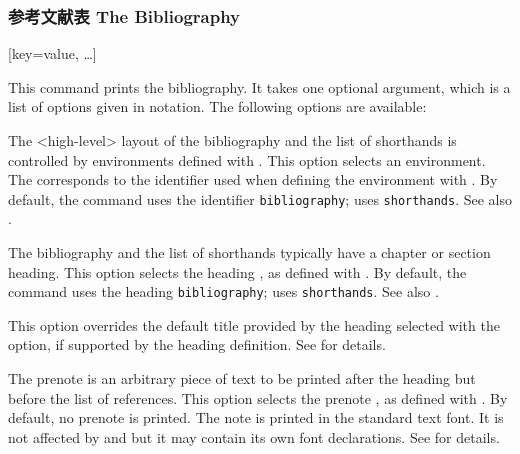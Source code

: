 \begin{ltxsyntax}
\subsubsection{参考文献表 The Bibliography}
\label{use:bib:bib}

[key=value, \dots]

This command prints the bibliography. It takes one optional argument, which is a list of options given in \keyval notation. The following options are available:

\end{ltxsyntax}

\begin{optionlist*}


The <high-level> layout of the bibliography and the list of shorthands is controlled by environments defined with . This option selects an environment. The  corresponds to the identifier used when defining the environment with . By default, the  command uses the identifier \texttt{bibliography};  uses \texttt{shorthands}. See also .


The bibliography and the list of shorthands typically have a chapter or section heading. This option selects the heading , as defined with . By default, the  command uses the heading \texttt{bibliography};  uses \texttt{shorthands}. See also .


This option overrides the default title provided by the heading selected with the  option, if supported by the heading definition. See  for details.


The prenote is an arbitrary piece of text to be printed after the heading but before the list of references. This option selects the prenote , as defined with . By default, no prenote is printed. The note is printed in the standard text font. It is not affected by  and  but it may contain its own font declarations. See  for details.


\end{optionlist*}
